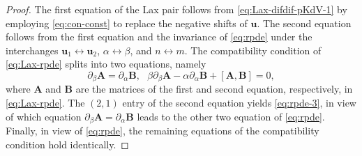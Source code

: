 \documentclass[dvips,10pt]{article}
\newcommand{\bs}{\boldsymbol}
\newcommand{\bsu}{ {\bs{u}}}
\theoremstyle{remark} %
\begin{document}
	\begin{proof}
		The first equation of the Lax pair follows from \eqref{eq:Lax-difdif-pKdV-1} by employing \eqref{eq:con-const} to replace the negative shifts of $\bsu$. The second equation follows from the first equation and the invariance of \eqref{eq:rpde} under the interchanges $\bsu_1 \leftrightarrow \bsu_2$, $\alpha \leftrightarrow \beta$, and $n \leftrightarrow m$. The compatibility condition of \eqref{eq:Lax-rpde} splits into two equations, namely 
		$$  \partial_\beta {\bs{A}} = \partial_\alpha {\bs{B}}, ~~~ \beta  \partial_\beta {\bs{A}}  - \alpha \partial_\alpha {\bs{B}} + [{\bs{A}},{\bs{B}}] = 0,$$
		where $\bs{A}$ and $\bs{B}$ are the matrices of the first and second equation, respectively, in \eqref{eq:Lax-rpde}. The $(2,1)$ entry of the second equation yields \eqref{eq:rpde-3}, in view of which equation $  \partial_\beta {\bs{A}} = \partial_\alpha {\bs{B}}$ leads to the other two equation of \eqref{eq:rpde}. Finally,  in view of \eqref{eq:rpde}, the remaining equations of the compatibility condition hold identically.
		

\end{proof}
\end{document}
